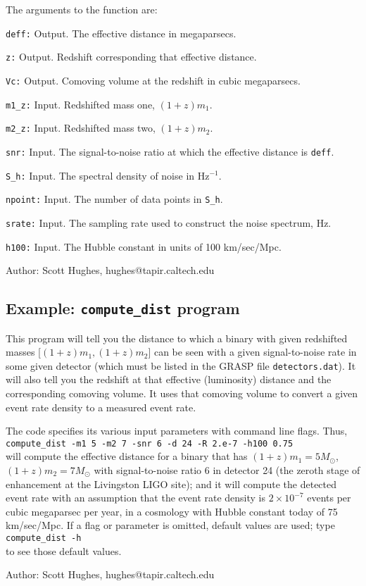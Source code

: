 The arguments to the function are:
\begin{description}
\item{{\tt deff:}} Output.  The effective distance in megaparsecs.
\item{{\tt z:}} Output.  Redshift corresponding that effective distance.
\item{{\tt Vc:}} Output.  Comoving volume at the redshift in cubic
megaparsecs.
\item{{\tt m1\_z:}} Input.  Redshifted mass one, $(1+z)m_1$.
\item{{\tt m2\_z:}} Input.  Redshifted mass two, $(1+z)m_2$.
\item{{\tt snr:}} Input.  The signal-to-noise ratio at which the
effective distance is {\tt deff}.
\item{{\tt S\_h:}} Input.  The spectral density of noise in Hz$^{-1}$.
\item{{\tt npoint:}} Input.  The number of data points in {\tt S\_h}.
\item{{\tt srate:}} Input.  The sampling rate used to construct the
noise spectrum, Hz.
\item{{\tt h100:}} Input.  The Hubble constant in units of 100 km/sec/Mpc.
\end{description}

\begin{description}
\item{Author:} Scott Hughes, hughes@tapir.caltech.edu
\end{description}

\clearpage
\subsection{Example: {\tt compute\_dist} program}
\label{ss:compute_dist}

This program will tell you the distance to which a binary with given
redshifted masses [$(1+z)m_1,(1+z)m_2$] can be seen with a given
signal-to-noise rate in some given detector (which must be listed in
the GRASP file {\tt detectors.dat}).  It will also tell you the
redshift at that effective (luminosity) distance and the corresponding
comoving volume.  It uses that comoving volume to convert a given
event rate density to a measured event rate.

The code specifies its various input parameters with command line
flags.  Thus,\\
{\tt compute\_dist -m1 5 -m2 7 -snr 6 -d 24 -R 2.e-7 -h100 0.75}\\
will compute the effective distance for a binary that has $(1+z)m_1 =
5M_\odot$, $(1+z)m_2 = 7M_\odot$ with signal-to-noise ratio 6 in detector
24 (the zeroth stage of enhancement at the Livingston LIGO site); and it
will compute the detected event rate with an assumption that the event
rate density is $2\times10^{-7}$ events per cubic megaparsec per year,
in a cosmology with Hubble constant today of 75 km/sec/Mpc.  If a flag
or parameter is omitted, default values are used; type\\
{\tt compute\_dist -h}\\
 to see those default
values.
     

\begin{description}
\item{Author:} Scott Hughes, hughes@tapir.caltech.edu
\end{description}

